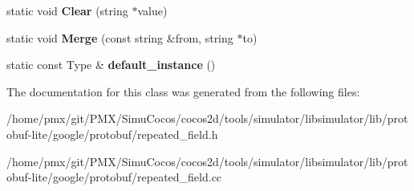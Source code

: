 \begin{DoxyCompactItemize}
static void {\bfseries Clear} (string $\ast$value)
\item 
\mbox{\label{classgoogle_1_1protobuf_1_1internal_1_1StringTypeHandlerBase_a569e02f1b679a792c0e04d6e80feb036}} 
static void {\bfseries Merge} (const string \&from, string $\ast$to)
\item 
\mbox{\label{classgoogle_1_1protobuf_1_1internal_1_1StringTypeHandlerBase_af4e75f9209592ebe2485060a076867e1}} 
static const Type \& {\bfseries default\+\_\+instance} ()
\end{DoxyCompactItemize}


The documentation for this class was generated from the following files\+:\begin{DoxyCompactItemize}
\item 
/home/pmx/git/\+P\+M\+X/\+Simu\+Cocos/cocos2d/tools/simulator/libsimulator/lib/protobuf-\/lite/google/protobuf/repeated\+\_\+field.\+h\item 
/home/pmx/git/\+P\+M\+X/\+Simu\+Cocos/cocos2d/tools/simulator/libsimulator/lib/protobuf-\/lite/google/protobuf/repeated\+\_\+field.\+cc\end{DoxyCompactItemize}
